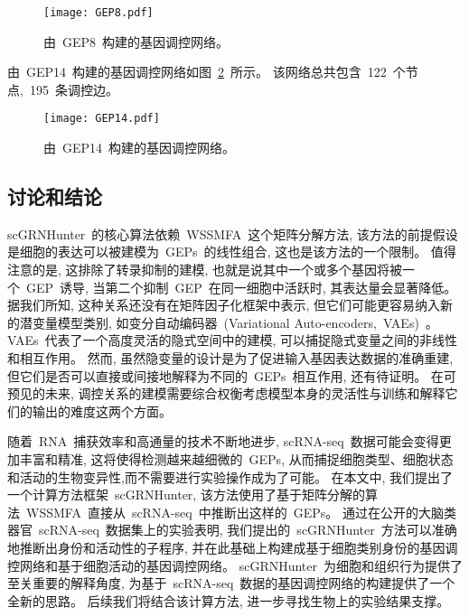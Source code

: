\begin{figure}[!htbp]
    \centering
    \texttt{[image: GEP8.pdf]}
    \caption{由~GEP8~构建的基因调控网络。}
    \label{fig:gep-grn-gep8}
\end{figure}

由~GEP14~构建的基因调控网络如图~\ref{fig:gep-grn-gep14}~所示。
该网络总共包含~122~个节点,~195~条调控边。
\begin{figure}[!htbp]
    \centering
    \texttt{[image: GEP14.pdf]}
    \caption{由~GEP14~构建的基因调控网络。}
    \label{fig:gep-grn-gep14}
\end{figure}


\subsection{讨论和结论}
scGRNHunter~的核心算法依赖~WSSMFA~这个矩阵分解方法,
该方法的前提假设是细胞的表达可以被建模为~GEPs~的线性组合,
这也是该方法的一个限制。
值得注意的是, 这排除了转录抑制的建模, 也就是说其中一个或多个基因将被一个~GEP~诱导,
当第二个抑制~GEP~在同一细胞中活跃时, 其表达量会显著降低。
据我们所知, 这种关系还没有在矩阵因子化框架中表示, 但它们可能更容易纳入新的潜变量模型类别,
如变分自动编码器~(Variational Auto-encoders,~VAEs)~\cite{ding2018interpretable,gronbech2018scvae}。
VAEs~代表了一个高度灵活的隐式空间中的建模, 可以捕捉隐式变量之间的非线性和相互作用。
然而, 虽然隐变量的设计是为了促进输入基因表达数据的准确重建, 
但它们是否可以直接或间接地解释为不同的~GEPs~相互作用, 还有待证明。
在可预见的未来, 调控关系的建模需要综合权衡考虑模型本身的灵活性与训练和解释它们的输出的难度这两个方面。

随着~RNA~捕获效率和高通量的技术不断地进步, scRNA-seq~数据可能会变得更加丰富和精准,
这将使得检测越来越细微的~GEPs, 从而捕捉细胞类型、细胞状态和活动的生物变异性,而不需要进行实验操作成为了可能。
在本文中, 我们提出了一个计算方法框架~scGRNHunter,
该方法使用了基于矩阵分解的算法~WSSMFA~直接从~scRNA-seq~中推断出这样的~GEPs。 
通过在公开的大脑类器官~scRNA-seq~数据集上的实验表明,
我们提出的~scGRNHunter~方法可以准确地推断出身份和活动性的子程序, 
并在此基础上构建成基于细胞类别身份的基因调控网络和基于细胞活动的基因调控网络。
scGRNHunter~为细胞和组织行为提供了至关重要的解释角度,
为基于~scRNA-seq~数据的基因调控网络的构建提供了一个全新的思路。
后续我们将结合该计算方法, 进一步寻找生物上的实验结果支撑。